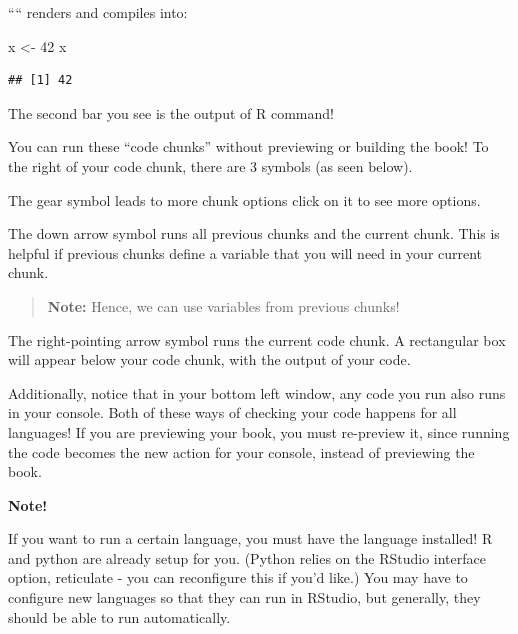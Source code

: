 \documentclass[
]{book}
\newenvironment{Shaded}{\begin{snugshade}}{\end{snugshade}}
\newcommand{\DecValTok}[1]{\textcolor[rgb]{0.00,0.00,0.81}{#1}}
\newcommand{\NormalTok}[1]{#1}
\newcommand{\OtherTok}[1]{\textcolor[rgb]{0.56,0.35,0.01}{#1}}
\newenvironment{redbox}{
  \definecolor{shadecolor}{RGB}{243, 154, 157}
  \color{white}
  \begin{shaded}}
 {\end{shaded}}
\theoremstyle{definition}
\theoremstyle{definition}
\theoremstyle{definition}
\theoremstyle{definition}
\theoremstyle{remark}
\begin{document}
````
renders and compiles into:

\begin{Shaded}
\begin{Highlighting}[]
\NormalTok{x }\OtherTok{\textless{}{-}} \DecValTok{42}
\NormalTok{x}
\end{Highlighting}
\end{Shaded}

\begin{verbatim}
## [1] 42
\end{verbatim}

The second bar you see is the output of R command!

You can run these ``code chunks'' without previewing or building the book! To the right of your code chunk, there are 3 symbols (as seen below).

The {gear symbol} leads to more chunk options click on it to see more options.

The {down arrow symbol} runs all previous chunks and the current chunk. This is helpful if previous chunks define a variable that you will need in your current chunk.

\begin{quote}
\textbf{Note:} Hence, we can use variables from previous chunks!
\end{quote}

The {right-pointing arrow symbol} runs the current code chunk. A rectangular box will appear below your code chunk, with the output of your code.

Additionally, notice that in your bottom left window, any code you run also runs in your console. Both of these ways of checking your code happens for all languages! If you are previewing your book, you must re-preview it, since running the code becomes the new action for your console, instead of previewing the book.

\begin{redbox}

\begin{center}
\textbf{Note!}

\end{center}

If you want to run a certain language, you must have the language installed! R and python are already setup for you. (Python relies on the RStudio interface option, reticulate - you can reconfigure this if you'd like.) You may have to configure new languages so that they can run in RStudio, but generally, they should be able to run automatically.

\end{redbox}
\end{document}
